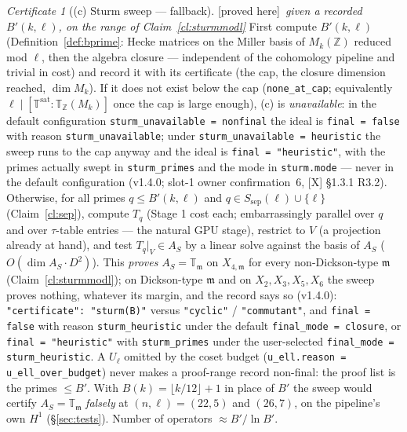 \documentclass[11pt]{article}
\theoremstyle{remark}
\newtheorem{certificate}[theorem]{Certificate}
\newcommand{\Z}{\mathbb{Z}}
\newcommand{\T}{\mathbb{T}}
\newcommand{\m}{\mathfrak{m}}
\newcommand{\PROVED}{\textsf{[proved here]}}
\begin{document}
\begin{certificate}[(c) Sturm sweep --- fallback]\label{cert:sturm}\PROVED\ \emph{given a recorded $B'(k,\ell)$, on the range of Claim~\ref{cl:sturmmodl}}
First compute $B'(k,\ell)$ (Definition~\ref{def:bprime}: Hecke matrices on the Miller basis of
$M_k(\Z)$ reduced mod $\ell$, then the algebra closure --- independent of the cohomology
pipeline and trivial in cost) and record it with its certificate (the cap, the closure
dimension reached, $\dim M_k$). If it does not exist below the cap (\texttt{none\_at\_cap};
equivalently $\ell\mid[\T^{\mathrm{sat}}:\T_\Z(M_k)]$ once the cap is large enough), (c) is
\emph{unavailable}: in the default configuration \texttt{sturm\_unavailable = nonfinal} the
ideal is \texttt{final = false} with reason \texttt{sturm\_unavailable}; under
\texttt{sturm\_unavailable = heuristic} the sweep runs to the cap anyway and the ideal is
\texttt{final = "heuristic"}, with the primes actually swept in \texttt{sturm\_primes} and the
mode in \texttt{sturm.mode} --- never in the default configuration (v1.4.0; slot-1 owner
confirmation~6, [X] \S1.3.1 R3.2).
Otherwise, for all primes $q\le B'(k,\ell)$ and $q\in S_{\mathrm{sep}}(\ell)\cup\{\ell\}$
(Claim~\ref{cl:sep}), compute $T_q$ (Stage 1 cost each; embarrassingly parallel over $q$ and
over $\tau$-table entries --- the natural GPU stage), restrict to $V$ (a projection already at
hand), and test $T_q|_V\in A_S$ by a linear solve against the basis of $A_S$
($O(\dim A_S\cdot D^2)$). This \emph{proves} $A_S=\T_\m$ on $X_{4,\m}$ for every
non-Dickson-type $\m$ (Claim~\ref{cl:sturmmodl}); on Dickson-type $\m$ and on $X_2,X_3,X_5,X_6$
the sweep proves nothing, whatever its margin, and the record says so (v1.4.0):
\texttt{"certificate": "sturm(B\textquotesingle)"} versus \texttt{"cyclic"} /
\texttt{"commutant"}, and \texttt{final = false} with reason \texttt{sturm\_heuristic} under the
default \texttt{final\_mode = closure}, or \texttt{final = "heuristic"} with
\texttt{sturm\_primes} under the user-selected \texttt{final\_mode = sturm\_heuristic}. A
$U_\ell$ omitted by the coset budget (\texttt{u\_ell.reason = u\_ell\_over\_budget}) never makes
a proof-range record non-final: the proof list is the primes $\le B'$. With
$B(k)=\lfloor k/12\rfloor+1$ in place of $B'$ the sweep would certify $A_S=\T_\m$ \emph{falsely}
at $(n,\ell)=(22,5)$ and $(26,7)$, on the pipeline's own $H^1$ (\S\ref{sec:tests}). Number of
operators $\approx B'/\ln B'$.
\end{certificate}
\end{document}
